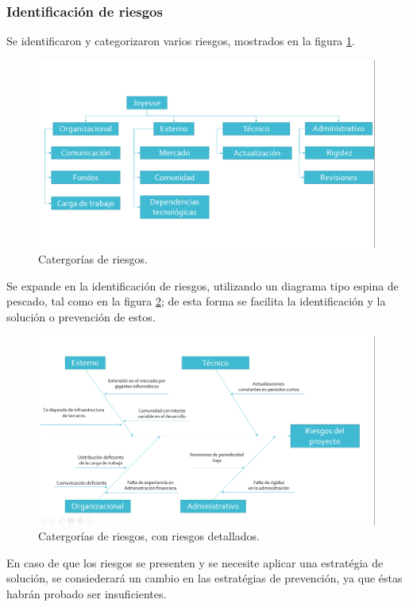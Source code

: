 \documentclass[]{article}
\begin{document}
\subsubsection{Identificaci\'on de riesgos}
Se identificaron y categorizaron varios riesgos, mostrados en la figura \ref{ries}.
\begin{figure} [H]
	\centering
	\includegraphics[width=1\textwidth]{RBS}
	\caption{Catergor\'ias de riesgos.} 
	\label{ries}
\end{figure}
Se expande en la identificaci\'on de riesgos, utilizando un diagrama tipo espina de pescado, tal como en la figura \ref{pescado}; de esta forma se facilita la identificaci\'on y la soluci\'on o prevenci\'on de estos. 
\begin{figure} [H]
	\centering
	\includegraphics[width=1\textwidth]{Espina}
	\caption{Catergor\'ias de riesgos, con riesgos detallados.} 
	\label{pescado}
\end{figure}

En caso de que los riesgos se presenten y se necesite aplicar una estrat\'egia de soluci\'on, se consiederar\'a un cambio en las estrat\'egias de prevenci\'on, ya que \'estas habr\'an probado ser insuficientes. 
\end{document}
